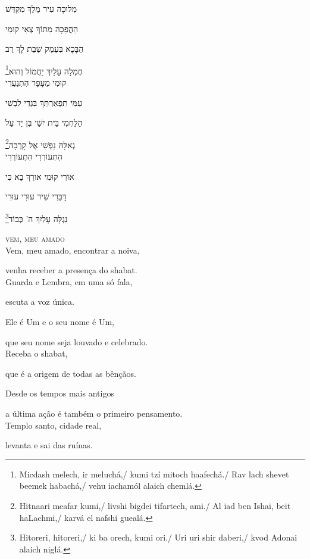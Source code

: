 מְלוּכָה עִיר מֶלֶךְ  מִקְדַּשׁ

הַהֲפֵכָה מִתּוֹךְ צְאִי קוּמִי 

הַבָּכָא בְּעֵמֶק שֶׁבֶת  לָךְ רַב

\footnote{Micdash melech, ir meluchá,/ kumi tzí mitoch haafechá./ Rav lach shevet beemek habachá,/ vehu iachamól alaich chemlá.}חֶמְלָה עָלַיִךְ יַחֲמוֹל  וְהוּא\\[10pt]

קוּמִי מֵעָפָר הִתְנַעֲרִי

עַמִּי תִפְאַרְתֵּךְ בִּגְדֵי לִבְשִׁי 

הַלַּחְמִי בֵּית יִשַׁי בֶּן יַד עַל

\footnote{Hitnaari meafar kumi,/ livshi bigdei tifartech, ami./ Al iad ben Ishai, beit haLachmi,/ karvá el nafshi guealá.}גְאלָּהּ נַפְשִׁי אֶל קָרְבָה\\[10pt]

הִתְעוֹרְרִי הִתְעוֹרְרִי

אוֹרִי קוּמִי אורֵךְ בָא כִּי

דַּבֵּרִי שִׁיר עוּרִי עוּרִי

\footnote{Hitoreri, hitoreri,/ ki ba orech, kumi ori./ Uri uri shir daberi,/ kvod Adonai alaich niglá.}נִגְלָּה עָלַיִךְ ה' כְּבוֹד\\[10pt]


\movetooddpage
\raggedright

\vspace*{1cm}
\textsc{vem, meu amado}\\[15pt]


Vem, meu amado, encontrar a noiva,

venha receber a presença do shabat.\\[10pt]

Guarda e Lembra, em uma só fala,

escuta a voz única.

Ele é Um e o seu nome é Um,

que seu nome seja louvado e celebrado.\\[10pt]

Receba o shabat,

que é a origem de todas as bênçãos.

Desde os tempos mais antigos

a última ação é também o primeiro pensamento.\\[10pt]

Templo santo, cidade real,

levanta e sai das ruínas.

